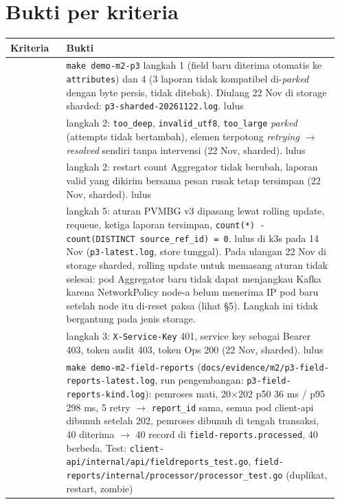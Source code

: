 \section{Bukti per kriteria}

{\small
\begin{longtable}{@{}>{\raggedright\arraybackslash}p{0.161\linewidth}>{\raggedright\arraybackslash}p{0.785\linewidth}@{}}
\toprule
\textbf{Kriteria} & \textbf{Bukti} \\
\midrule
\endhead
1 & \texttt{make demo-\allowbreak{}m2-\allowbreak{}p3} langkah 1 (field baru diterima otomatis ke \texttt{attributes}) dan 4 (3 laporan tidak kompatibel di-\emph{parked} dengan byte persis, tidak ditebak). Diulang 22 Nov di storage sharded: \texttt{p3-\allowbreak{}sharded-\allowbreak{}20261122.\allowbreak{}log}. lulus \\
2 & langkah 2: \texttt{too\_\allowbreak{}deep}, \texttt{invalid\_\allowbreak{}utf8}, \texttt{too\_\allowbreak{}large} \emph{parked} (attempts tidak bertambah), elemen terpotong \emph{retrying} $\rightarrow$ \emph{resolved} sendiri tanpa intervensi (22 Nov, sharded). lulus \\
3 & langkah 2: restart count Aggregator tidak berubah, laporan valid yang dikirim bersama pesan rusak tetap tersimpan (22 Nov, sharded). lulus \\
4 & langkah 5: aturan PVMBG v3 dipasang lewat rolling update, requeue, ketiga laporan tersimpan, \texttt{count(*) -\allowbreak{} count(DISTINCT source\_\allowbreak{}ref\_\allowbreak{}id) =\allowbreak{} 0}. lulus di k3s pada 14 Nov (\texttt{p3-\allowbreak{}latest.\allowbreak{}log}, store tunggal). Pada ulangan 22 Nov di storage sharded, rolling update untuk memasang aturan tidak selesai: pod Aggregator baru tidak dapat menjangkau Kafka karena NetworkPolicy node-a belum menerima IP pod baru setelah node itu di-reset paksa (lihat §5). Langkah ini tidak bergantung pada jenis storage. \\
5 & langkah 3: \texttt{X-\allowbreak{}Service-\allowbreak{}Key} 401, service key sebagai Bearer 403, token audit 403, token Ops 200 (22 Nov, sharded). lulus \\
6 & \texttt{make demo-\allowbreak{}m2-\allowbreak{}field-\allowbreak{}reports} (\texttt{docs/\allowbreak{}evidence/\allowbreak{}m2/\allowbreak{}p3-\allowbreak{}field-\allowbreak{}reports-\allowbreak{}latest.\allowbreak{}log}, run pengembangan: \texttt{p3-\allowbreak{}field-\allowbreak{}reports-\allowbreak{}kind.\allowbreak{}log}): pemroses mati, 20$\times$202 p50 36 ms / p95 298 ms, 5 retry $\rightarrow$ \texttt{report\_\allowbreak{}id} sama, semua pod client-api dibunuh setelah 202, pemroses dibunuh di tengah transaksi, 40 diterima $\rightarrow$ 40 record di \texttt{field-\allowbreak{}reports.\allowbreak{}processed}, 40 berbeda. Test: \texttt{client-\allowbreak{}api/\allowbreak{}internal/\allowbreak{}api/\allowbreak{}fieldreports\_\allowbreak{}test.\allowbreak{}go}, \texttt{field-\allowbreak{}reports/\allowbreak{}internal/\allowbreak{}processor/\allowbreak{}processor\_\allowbreak{}test.\allowbreak{}go} (duplikat, restart, zombie) \\
\bottomrule
\end{longtable}
}

